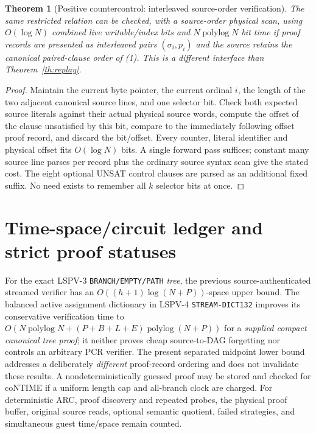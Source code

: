 \documentclass[11pt]{article}
\newtheorem{theorem}{Theorem}
\begin{document}
\begin{theorem}[Positive countercontrol: interleaved source-order verification]\label{th:interleave}
The same restricted relation can be checked, with a source-order physical scan, using \(O(\log N)\) combined live writable/index bits and \(N\operatorname{polylog}N\) bit time if proof records are presented as interleaved pairs \((\sigma_i,p_i)\) and the source retains the canonical paired-clause order of (1). This is a different interface than Theorem~\ref{th:replay}.
\end{theorem}
\begin{proof}
Maintain the current byte pointer, the current ordinal \(i\), the length of the two adjacent canonical source lines, and one selector bit. Check both expected source literals against their actual physical source words, compute the offset of the clause unsatisfied by this bit, compare to the immediately following offset proof record, and discard the bit/offset. Every counter, literal identifier and physical offset fits \(O(\log N)\) bits. A single forward pass suffices; constant many source line parses per record plus the ordinary source syntax scan give the stated cost. The eight optional UNSAT control clauses are parsed as an additional fixed suffix. No need exists to remember all \(k\) selector bits at once.
\end{proof}

\section{Time-space/circuit ledger and strict proof statuses}
For the exact LSPV-3 \texttt{BRANCH/EMPTY/PATH} \emph{tree}, the previous source-authenticated streamed verifier has an \(O((h+1)\log(N+P))\)-space upper bound. The balanced active assignment dictionary in LSPV-4 \texttt{STREAM-DICT132} improves its conservative verification time to \(O(N\operatorname{polylog}N+(P+B+L+E)\operatorname{polylog}(N+P))\) for a \emph{supplied compact canonical tree proof}; it neither proves cheap source-to-DAG forgetting nor controls an arbitrary PCR verifier. The present separated midpoint lower bound addresses a deliberately \emph{different} proof-record ordering and does not invalidate these results. A nondeterministically guessed proof may be stored and checked for coNTIME if a uniform length cap and all-branch clock are charged. For deterministic ARC, proof discovery and repeated probes, the physical proof buffer, original source reads, optional semantic quotient, failed strategies, and simultaneous guest time/space remain counted.
\end{document}
